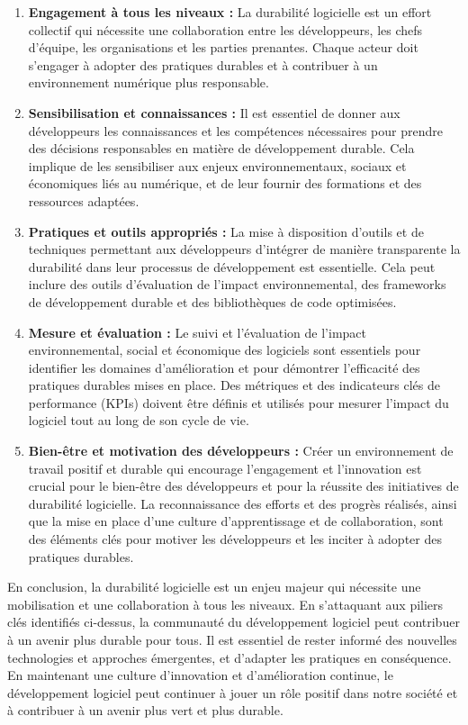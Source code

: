 \begin{enumerate}
    \item \textbf{Engagement à tous les niveaux :} La durabilité logicielle est un effort collectif qui nécessite une collaboration entre les développeurs, les chefs d'équipe, les organisations et les parties prenantes. Chaque acteur doit s'engager à adopter des pratiques durables et à contribuer à un environnement numérique plus responsable.
    \item \textbf{Sensibilisation et connaissances :} Il est essentiel de donner aux développeurs les connaissances et les compétences nécessaires pour prendre des décisions responsables en matière de développement durable. Cela implique de les sensibiliser aux enjeux environnementaux, sociaux et économiques liés au numérique, et de leur fournir des formations et des ressources adaptées.
     \item \textbf{Pratiques et outils appropriés :} La mise à disposition d'outils et de techniques permettant aux développeurs d'intégrer de manière transparente la durabilité dans leur processus de développement est essentielle. Cela peut inclure des outils d'évaluation de l'impact environnemental, des frameworks de développement durable et des bibliothèques de code optimisées.
    \item \textbf{Mesure et évaluation :} Le suivi et l'évaluation de l'impact environnemental, social et économique des logiciels sont essentiels pour identifier les domaines d'amélioration et pour démontrer l'efficacité des pratiques durables mises en place. Des métriques et des indicateurs clés de performance (KPIs) doivent être définis et utilisés pour mesurer l'impact du logiciel tout au long de son cycle de vie.
    \item \textbf{Bien-être et motivation des développeurs :} Créer un environnement de travail positif et durable qui encourage l'engagement et l'innovation est crucial pour le bien-être des développeurs et pour la réussite des initiatives de durabilité logicielle. La reconnaissance des efforts et des progrès réalisés, ainsi que la mise en place d'une culture d'apprentissage et de collaboration, sont des éléments clés pour motiver les développeurs et les inciter à adopter des pratiques durables.
\end{enumerate}


En conclusion, la durabilité logicielle est un enjeu majeur qui nécessite une mobilisation et une collaboration à tous les niveaux. En s'attaquant aux piliers clés identifiés ci-dessus, la communauté du développement logiciel peut contribuer à un avenir plus durable pour tous. Il est essentiel de rester informé des nouvelles technologies et approches émergentes, et d'adapter les pratiques en conséquence. En maintenant une culture d'innovation et d'amélioration continue, le développement logiciel peut continuer à jouer un rôle positif dans notre société et à contribuer à un avenir plus vert et plus durable.

